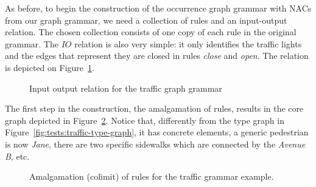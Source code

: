 As before, to begin the construction of the occurrence graph grammar with NACs from our graph grammar, we need a collection of rules and an input-output relation. The chosen collection consists of one copy of each rule in the original grammar. The $IO$ relation is also very simple: it only identifies the traffic lights and the edges that represent they are closed in rules \emph{close} and \emph{open}. The relation is depicted on Figure~\ref{fig:tests:inout-traffic}.

\begin{figure}[!ht]
\centering
{}
\caption{Input output relation for the traffic graph grammar}\label{fig:tests:inout-traffic}
\end{figure}

The first step in the construction, the amalgamation of rules, results in the core graph depicted in Figure~\ref{fig:tests:amalgamation-traffic}. Notice that, differently from the type graph in Figure~\ref{fig:tests:traffic-type-graph}, it has concrete elements, a generic pedestrian is now \emph{Jane}, there are two specific sidewalks which are connected by the \emph{Avenue B}, etc.

\begin{figure}[!ht]
  \centering
  \caption{Amalgamation (colimit) of rules for the traffic grammar example.}\label{fig:tests:amalgamation-traffic}
\end{figure}

